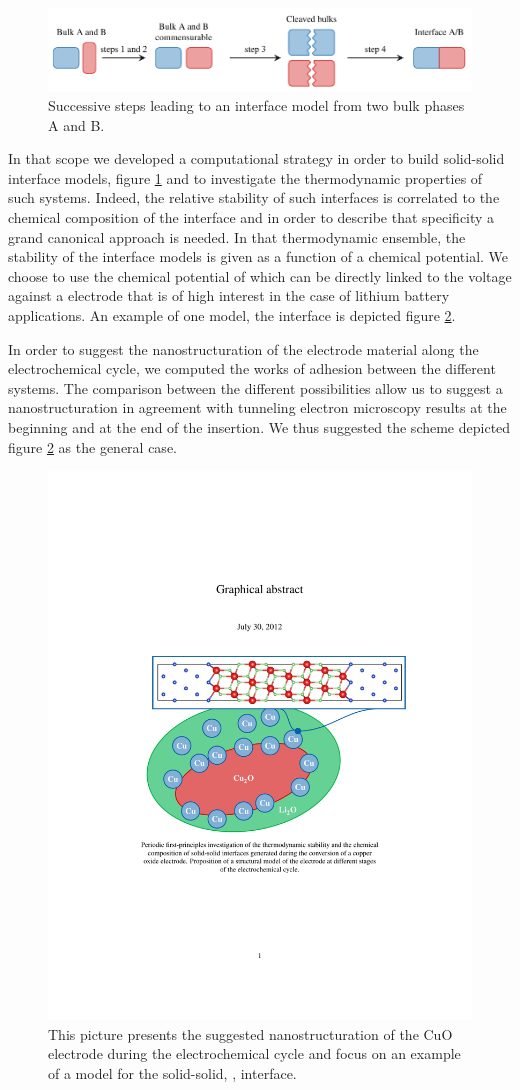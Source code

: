\documentclass[11pt]{artuppax}
\begin{document}
\begin{figure}[h]
    \centering
    \includegraphics[width=.8\textwidth]{img/cycleThermo}
    \caption{Successive steps leading to an interface model from two bulk phases A and B.}
    \label{fig:cycleThermo}
\end{figure}

In that scope we developed a computational strategy in order to build solid-solid interface models,
figure \ref{fig:cycleThermo} and to investigate the thermodynamic properties of such systems. Indeed,
the relative stability of such interfaces is correlated to the chemical composition of the interface
and in order to describe that specificity a grand canonical approach is needed. In that thermodynamic
ensemble, the stability of the interface models is given as a function of a chemical potential. We
choose to use the chemical potential of  which can be directly linked to the voltage against
a  electrode that is of high interest in the case of lithium battery applications. An
example of one model, the  interface is depicted figure \ref{fig:interfaces}.

In order to suggest the nanostructuration of the electrode material along the electrochemical
cycle, we computed the works of adhesion between the different systems. The comparison between the
different possibilities allow us to suggest a nanostructuration in agreement with tunneling electron
microscopy results at the beginning and at the end of the  insertion. We thus suggested the
scheme depicted figure \ref{fig:interfaces} as the general case.

\begin{figure}[h]
    \centering
    \includegraphics[width=.5\textwidth]{img/interfaces}
    \caption{This picture presents the suggested nanostructuration of the CuO electrode during
    the electrochemical cycle and focus on an example of a model for the solid-solid, ,
    interface.}
    \label{fig:interfaces}
\end{figure}
\end{document}

